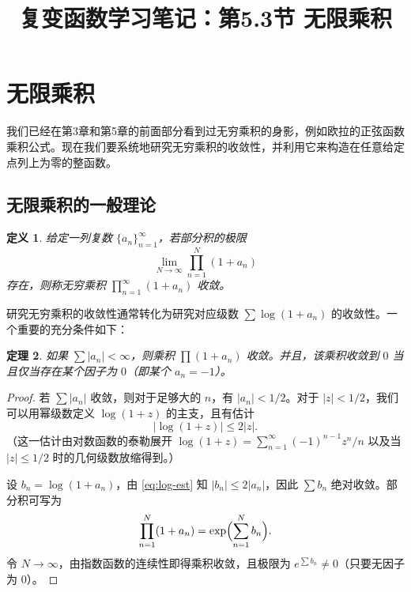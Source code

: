 \documentclass[UTF8]{ctexart}
\title{复变函数学习笔记：第5.3节 无限乘积}
\author{}
\date{}
\newtheorem{theorem}{定理}[section]
\newtheorem{definition}[theorem]{定义}
\numberwithin{equation}{section}
\begin{document}
\maketitle

\section{无限乘积}

我们已经在第3章和第5章的前面部分看到过无穷乘积的身影，例如欧拉的正弦函数乘积公式。现在我们要系统地研究无穷乘积的收敛性，并利用它来构造在任意给定点列上为零的整函数。

\subsection{无限乘积的一般理论}

\begin{definition}
给定一列复数 \(\{a_n\}_{n=1}^\infty\)，若部分积的极限
\begin{equation}
\lim_{N \to \infty} \prod_{n=1}^N (1 + a_n)
\end{equation}
存在，则称无穷乘积 \(\prod_{n=1}^\infty (1 + a_n)\) 收敛。
\end{definition}

研究无穷乘积的收敛性通常转化为研究对应级数 \(\sum \log(1 + a_n)\) 的收敛性。一个重要的充分条件如下：

\begin{theorem}\label{thm:product-conv}
如果 \(\sum |a_n| < \infty\)，则乘积 \(\prod (1 + a_n)\) 收敛。并且，该乘积收敛到 \(0\) 当且仅当存在某个因子为 \(0\)（即某个 \(a_n = -1\)）。
\end{theorem}

\begin{proof}
若 \(\sum |a_n|\) 收敛，则对于足够大的 \(n\)，有 \(|a_n| < 1/2\)。对于 \(|z| < 1/2\)，我们可以用幂级数定义 \(\log(1+z)\) 的主支，且有估计
\begin{equation}\label{eq:log-est}
|\log(1+z)| \le 2|z|.
\end{equation}
（这一估计由对数函数的泰勒展开 \(\log(1+z) = \sum_{n=1}^\infty (-1)^{n-1} z^n/n\) 以及当 \(|z| \le 1/2\) 时的几何级数放缩得到。）

设 \(b_n = \log(1 + a_n)\)，由 \eqref{eq:log-est} 知 \(|b_n| \le 2|a_n|\)，因此 \(\sum b_n\) 绝对收敛。部分积可写为
\[
\prod_{n=1}^N (1 + a_n) = \exp\Bigl( \sum_{n=1}^N b_n \Bigr).
\]
令 \(N \to \infty\)，由指数函数的连续性即得乘积收敛，且极限为 \(e^{\sum b_n} \neq 0\)（只要无因子为 \(0\)）。
\end{proof}
\end{document}

